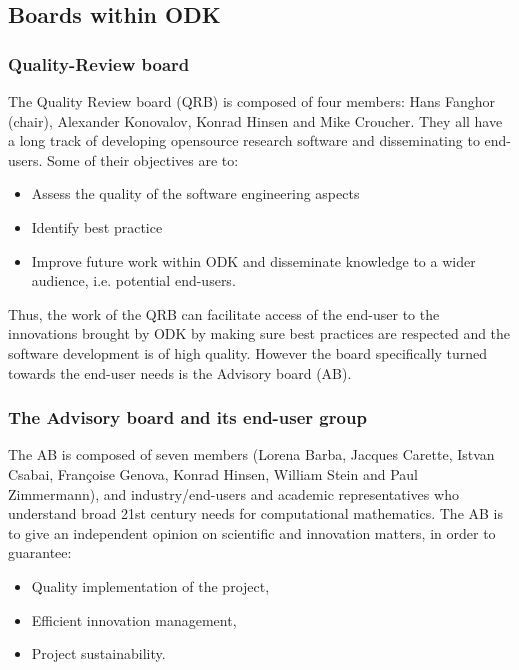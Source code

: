 \documentclass{deliverablereport}
\begin{document}
\subsection{Boards within ODK}

\subsubsection{Quality-Review board}

The Quality Review board (QRB) is composed of four members: Hans
Fanghor (chair), Alexander Konovalov, Konrad Hinsen and Mike
Croucher. They all have a long track of developing opensource research
software and disseminating to end-users. Some of their objectives are
to:

\begin{itemize}
\item{Assess the quality of the software engineering aspects}
\item{Identify best practice}
\item{Improve future work within ODK and disseminate knowledge to a wider audience, i.e. potential end-users.}
\end{itemize}

Thus, the work of the QRB can facilitate access of the end-user to the
innovations brought by ODK by making sure best practices are
respected and the software development is of high quality. However the
board specifically turned towards the end-user needs is the Advisory
board (AB).

\subsubsection{The Advisory board and its end-user group}

The AB is composed of seven members (Lorena Barba, Jacques Carette,
Istvan Csabai, Françoise Genova, Konrad Hinsen, William Stein and Paul
Zimmermann), and industry/end-users and academic representatives who
understand broad 21st century needs for computational mathematics.
The AB is to give an independent opinion on scientific and innovation
matters, in order to guarantee:

\begin{itemize}
\item Quality implementation of the project,
\item Efficient innovation management,
\item Project sustainability.
\end{itemize}
\end{document}
